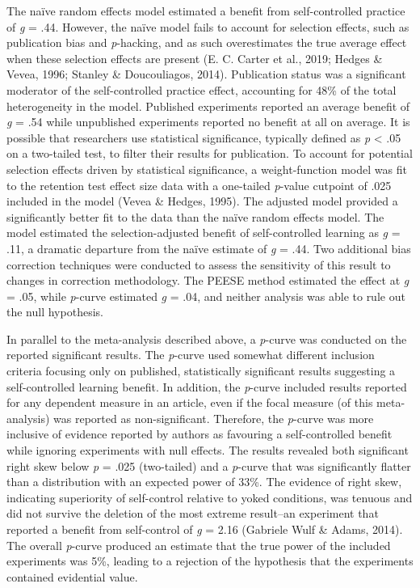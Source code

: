\documentclass[
  english,
  man,floatsintext]{apa7}
\begin{document}
The naïve random effects model estimated a benefit from self-controlled practice of \emph{g} = .44. However, the naïve model fails to account for selection effects, such as publication bias and \emph{p}-hacking, and as such overestimates the true average effect when these selection effects are present (E. C. Carter et al., 2019; Hedges \& Vevea, 1996; Stanley \& Doucouliagos, 2014). Publication status was a significant moderator of the self-controlled practice effect, accounting for 48\% of the total heterogeneity in the model. Published experiments reported an average benefit of \emph{g} = .54 while unpublished experiments reported no benefit at all on average. It is possible that researchers use statistical significance, typically defined as \emph{p} \textless{} .05 on a two-tailed test, to filter their results for publication. To account for potential selection effects driven by statistical significance, a weight-function model was fit to the retention test effect size data with a one-tailed \emph{p}-value cutpoint of .025 included in the model (Vevea \& Hedges, 1995). The adjusted model provided a significantly better fit to the data than the naïve random effects model. The model estimated the selection-adjusted benefit of self-controlled learning as \emph{g} = .11, a dramatic departure from the naïve estimate of \emph{g} = .44. Two additional bias correction techniques were conducted to assess the sensitivity of this result to changes in correction methodology. The PEESE method estimated the effect at \emph{g} = .05, while \emph{p}-curve estimated \emph{g} = .04, and neither analysis was able to rule out the null hypothesis.

In parallel to the meta-analysis described above, a \emph{p}-curve was conducted on the reported significant results. The \emph{p}-curve used somewhat different inclusion criteria focusing only on published, statistically significant results suggesting a self-controlled learning benefit. In addition, the \emph{p}-curve included results reported for any dependent measure in an article, even if the focal measure (of this meta-analysis) was reported as non-significant. Therefore, the \emph{p}-curve was more inclusive of evidence reported by authors as favouring a self-controlled benefit while ignoring experiments with null effects. The results revealed both significant right skew below \emph{p} = .025 (two-tailed) and a \emph{p}-curve that was significantly flatter than a distribution with an expected power of 33\%. The evidence of right skew, indicating superiority of self-control relative to yoked conditions, was tenuous and did not survive the deletion of the most extreme result--an experiment that reported a benefit from self-control of \emph{g} = 2.16 (Gabriele Wulf \& Adams, 2014). The overall \emph{p}-curve produced an estimate that the true power of the included experiments was 5\%, leading to a rejection of the hypothesis that the experiments contained evidential value.
\end{document}
